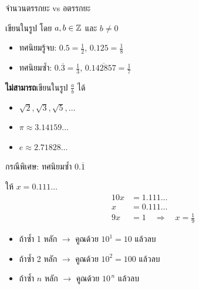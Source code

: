 \documentclass[11pt, aspectratio=169]{beamer}
\begin{document}
\begin{frame}{จำนวนตรรกยะ vs อตรรกยะ}
  \begin{explanation}
    เขียนในรูป  โดย $a, b \in \mathbb{Z}$ และ $b \neq 0$
    \begin{itemize}
      \item ทศนิยมรู้จบ: $0.5 = \frac{1}{2}$, $0.125 = \frac{1}{8}$
      \item ทศนิยมซํ้า: $0.\overline{3} = \frac{1}{3}$, $0.\overline{142857} = \frac{1}{7}$
    \end{itemize}
  \end{explanation}

  \begin{explanation}
    \textbf{ไม่สามารถ}เขียนในรูป $\frac{a}{b}$ ได้
    \begin{itemize}
      \item $\sqrt{2}, \sqrt{3}, \sqrt{5}, \ldots$
      \item $\pi \approx 3.14159\ldots$
      \item $e \approx 2.71828\ldots$
    \end{itemize}
  \end{explanation}
\end{frame}

\begin{frame}{กรณีพิเศษ: ทศนิยมซํ้า $0.\overline{1}$}
  \begin{exambox}
    ให้ $x = 0.111\ldots$
    \begin{align*}
      10x &= 1.111\ldots \\
      x   &= 0.111\ldots \\
      \hline
      9x  &= 1 \quad \Rightarrow \quad x = \tfrac{1}{9}
    \end{align*}
  \end{exambox}

  \begin{intuition}
    \begin{itemize}
      \item ถ้าซํ้า 1 หลัก $\rightarrow$ คูณด้วย $10^1 = 10$ แล้วลบ
      \item ถ้าซํ้า 2 หลัก $\rightarrow$ คูณด้วย $10^2 = 100$ แล้วลบ
      \item ถ้าซํ้า $n$ หลัก $\rightarrow$ คูณด้วย $10^{\,n}$ แล้วลบ
    \end{itemize}
  \end{intuition}
\end{frame}
\end{document}
